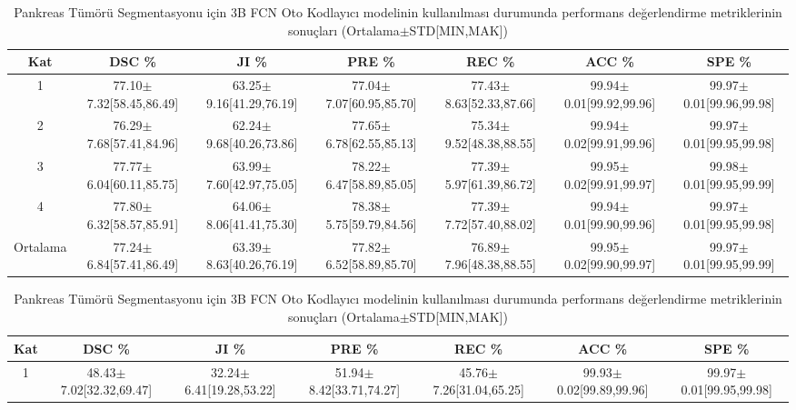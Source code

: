 \begin{table}
	\centering
	\caption{Pankreas Segmentasyonu için 3B FCN Oto Kodlayıcı modelinin kullanılması durumunda performans değerlendirme metriklerinin sonuçları (Ortalama$\pm$STD[MIN,MAK])}
	\label{tab:p2autoencoderp}
	\begin{adjustbox}{width=\textwidth}		
		\begin{tabular}{ccccccc}
			\toprule
			Kat   &  DSC \%       &  JI  \%   &  PRE  \%   &  REC  \%  & ACC  \%  &  SPE  \% \\ 
			\midrule 
			1 & 77.10$\pm$7.32[58.45,86.49] & 63.25$\pm$9.16[41.29,76.19] & 77.04$\pm$7.07[60.95,85.70] & 77.43$\pm$8.63[52.33,87.66] & 99.94$\pm$0.01[99.92,99.96] & 99.97$\pm$0.01[99.96,99.98] \\
            2 & 76.29$\pm$7.68[57.41,84.96] & 62.24$\pm$9.68[40.26,73.86] & 77.65$\pm$6.78[62.55,85.13] & 75.34$\pm$9.52[48.38,88.55] & 99.94$\pm$0.02[99.91,99.96] & 99.97$\pm$0.01[99.95,99.98] \\
            3 & 77.77$\pm$6.04[60.11,85.75] & 63.99$\pm$7.60[42.97,75.05] & 78.22$\pm$6.47[58.89,85.05] & 77.39$\pm$5.97[61.39,86.72] & 99.95$\pm$0.02[99.91,99.97] & 99.98$\pm$0.01[99.95,99.99] \\
            4 & 77.80$\pm$6.32[58.57,85.91] & 64.06$\pm$8.06[41.41,75.30] & 78.38$\pm$5.75[59.79,84.56] & 77.39$\pm$7.72[57.40,88.02] & 99.94$\pm$0.01[99.90,99.96] & 99.97$\pm$0.01[99.95,99.98] \\
			\toprule
			Ortalama  & 77.24$\pm$6.84[57.41,86.49] & 63.39$\pm$8.63[40.26,76.19] & 77.82$\pm$6.52[58.89,85.70] & 76.89$\pm$7.96[48.38,88.55] & 99.95$\pm$0.02[99.90,99.97] & 99.97$\pm$0.01[99.95,99.99] \\
            \bottomrule			
		\end{tabular}
	\end{adjustbox}
	\vspace{2\baselineskip}
	\caption{Pankreas Tümörü Segmentasyonu için 3B FCN Oto Kodlayıcı modelinin kullanılması durumunda performans değerlendirme metriklerinin sonuçları (Ortalama$\pm$STD[MIN,MAK])}
	\label{tab:p2autoencodert}
	\begin{adjustbox}{width=\textwidth}		
		\begin{tabular}{ccccccc}
			\toprule
			Kat   &  DSC \%       &  JI  \%   &  PRE  \%   &  REC  \%  & ACC  \%  &  SPE  \% \\ 
			\midrule 
			1 & 48.43$\pm$7.02[32.32,69.47] & 32.24$\pm$6.41[19.28,53.22] & 51.94$\pm$8.42[33.71,74.27] & 45.76$\pm$7.26[31.04,65.25] & 99.93$\pm$0.02[99.89,99.96] & 99.97$\pm$0.01[99.95,99.98] \\

\end{tabular}
\end{adjustbox}
\end{table}
